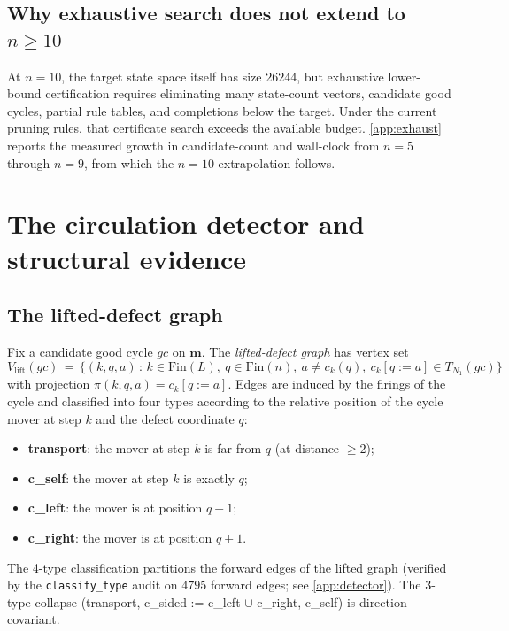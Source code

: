 \documentclass[11pt,a4paper]{article}
\theoremstyle{plain}
\theoremstyle{definition}
\begin{document}
\subsection{Why exhaustive search does not extend to $n \ge 10$}\label{sec:lower-no-extend}

At $n = 10$, the target state space itself has size $26244$, but
exhaustive lower-bound certification requires eliminating many
state-count vectors, candidate good cycles, partial rule tables, and
completions below the target.  Under the current pruning rules, that
certificate search exceeds the available budget.  \cref{app:exhaust}
reports the measured growth in candidate-count and wall-clock from
$n = 5$ through $n = 9$, from which the $n = 10$ extrapolation follows.

\section{The circulation detector and structural evidence}\label{sec:detector}

\subsection{The lifted-defect graph}\label{sec:detector-graph}

Fix a candidate good cycle $gc$ on $\mathbf{m}$.  The
\emph{lifted-defect graph} has vertex set
\[
   V_{\mathrm{lift}}(gc) \,=\, \bigl\{ (k, q, a) \,:\, k \in \mathrm{Fin}(L),\ q \in \mathrm{Fin}(n),\ a \ne c_k(q),\ c_k[q := a] \in T_{N_1}(gc) \bigr\}
\]
with projection $\pi(k, q, a) = c_k[q := a]$.  Edges are induced by the
firings of the cycle and classified into four types according to the
relative position of the cycle mover at step $k$ and the defect
coordinate $q$:
\begin{itemize}[leftmargin=*]
\item \textbf{transport}: the mover at step $k$ is far from $q$ (at
distance $\ge 2$);
\item \textbf{c\_self}: the mover at step $k$ is exactly $q$;
\item \textbf{c\_left}: the mover is at position $q - 1$;
\item \textbf{c\_right}: the mover is at position $q + 1$.
\end{itemize}
The 4-type classification partitions the forward edges of the lifted
graph (verified by the \texttt{classify\_type} audit on $4795$ forward
edges; see \cref{app:detector}).  The 3-type collapse
(transport, c\_sided := c\_left $\cup$ c\_right, c\_self) is direction-covariant.
\end{document}
